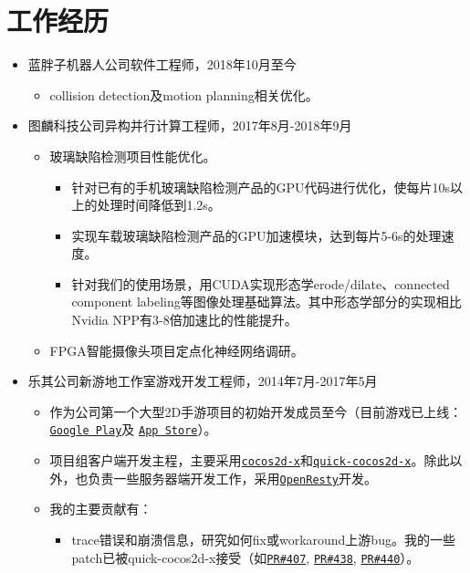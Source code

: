 \documentclass[letterpaper]{article}
\begin{document}
\section*{工作经历}
\begin{itemize}
  \item 蓝胖子机器人公司软件工程师，2018年10月至今
    \begin{itemize}
      \item collision detection及motion planning相关优化。
    \end{itemize}
  \item 图麟科技公司异构并行计算工程师，2017年8月-2018年9月
    \begin{itemize}
      \item 玻璃缺陷检测项目性能优化。
        \begin{itemize}
          \item 针对已有的手机玻璃缺陷检测产品的GPU代码进行优化，使每片10s以上的处理时间降低到1.2s。
          \item 实现车载玻璃缺陷检测产品的GPU加速模块，达到每片5-6s的处理速度。
          \item 针对我们的使用场景，用CUDA实现形态学erode/dilate、connected component labeling等图像处理基础算法。其中形态学部分的实现相比Nvidia NPP有3-8倍加速比的性能提升。
        \end{itemize}
      \item FPGA智能摄像头项目定点化神经网络调研。
    \end{itemize}
  \item 乐其公司新游地工作室游戏开发工程师，2014年7月-2017年5月
    \begin{itemize}
      \item 作为公司第一个大型2D手游项目的初始开发成员至今（目前游戏已上线：
        \href{https://play.google.com/store/apps/details?id=com.game168.yysg}{\tt Google Play}及
        \href{https://itunes.apple.com/us/app/ye-ye-san-guo/id976517523?mt=8}{\tt App Store}）。
      \item 项目组客户端开发主程，主要采用\href{http://cocos2d-x.org/}{\tt cocos2d-x}和\href{https://github.com/dualface/v3quick}{\tt quick-cocos2d-x}。除此以外，也负责一些服务器端开发工作，采用\href{https://github.com/openresty/openresty}{\tt OpenResty}开发。
      \item 我的主要贡献有：
        \begin{itemize}
          \item trace错误和崩溃信息，研究如何fix或workaround上游bug。我的一些patch已被quick-cocos2d-x接受（如\href{https://github.com/dualface/v3quick/pull/407}{\tt PR\#407}, \href{https://github.com/dualface/v3quick/pull/438}{\tt PR\#438}, \href{https://github.com/dualface/v3quick/pull/440}{\tt PR\#440}）。

\end{itemize}
\end{itemize}
\end{itemize}
\end{document}
